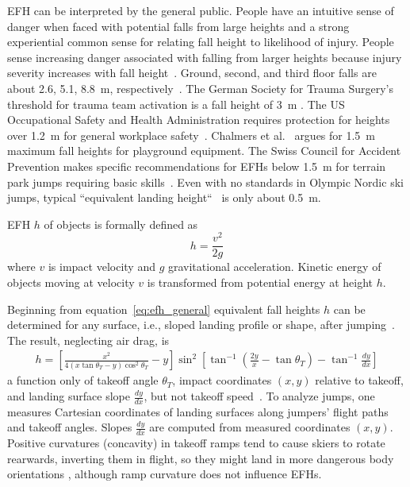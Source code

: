 \documentclass{article}
\begin{document}
EFH can be interpreted by the general public. People have an intuitive sense of
danger when faced with potential falls from large heights and a strong
experiential common sense for relating fall height to likelihood of injury.
People sense increasing danger associated with falling from larger heights
because injury severity increases with fall height~\cite{Nau2021}.
Ground, second, and third floor falls are about 2.6, 5.1, 8.8~\si{\meter},
respectively~\cite{Vish2005}. The German Society for Trauma Surgery's threshold
for trauma team activation is a fall height of 3~\si{\meter}
\cite{PolytraumaGuidelineUpdateGroup2018}. The US Occupational Safety and
Health Administration requires protection for heights over 1.2~\si{\meter} for general workplace safety~\cite{OSHA2021}.  Chalmers et
al.~\cite{Chalmers1996} argues for 1.5~\si{\meter} maximum fall heights for
playground equipment. The Swiss Council for Accident Prevention makes specific
recommendations for EFHs below 1.5~\si{\meter} for terrain park jumps requiring
basic skills~\cite{Heer2019}.  Even with no standards in Olympic Nordic ski
jumps, typical ``equivalent landing height``~\cite{Gasser2018} is only about
0.5~\si{\meter}.

EFH $h$ of objects is formally defined as
%
\begin{equation}
  h = \frac{v^2}{2g}
  \label{eq:efh_general}
\end{equation}
%
where $v$ is impact velocity and $g$ gravitational acceleration.  Kinetic
energy of objects moving at  velocity $v$  is transformed from potential energy
at height $h$.

Beginning from equation~\ref{eq:efh_general} equivalent fall heights $h$ can be
determined for any surface, i.e., sloped landing profile or shape, after
jumping~\cite{Petrone2017}. The result, neglecting air drag, is
%
\begin{align}
  h = \left[\frac{x^2}{4(x\tan\theta_T - y)\cos^{2}\theta_T} - y\right]
    \sin^{2}
    \left[\tan^{-1}\left(\frac{2y}{x} - \tan\theta_T\right) -
    \tan^{-1}\frac{dy}{dx}\right]
  \label{eq:efh}
\end{align}
%
a function only of takeoff angle $\theta_T$, impact coordinates $(x,y)$
relative to takeoff, and landing surface slope $\frac{dy}{dx}$, but not takeoff speed~\cite{Petrone2017}. To analyze jumps, one measures
Cartesian coordinates of landing surfaces along jumpers' flight paths and
takeoff angles. Slopes $\frac{dy}{dx}$ are computed from measured coordinates
$(x,y)$. Positive curvatures (concavity) in takeoff ramps tend to cause skiers to rotate rearwards, inverting them in flight, so they might land in more dangerous body orientations \cite{Scher2015}, although ramp curvature does not influence EFHs.
\end{document}

